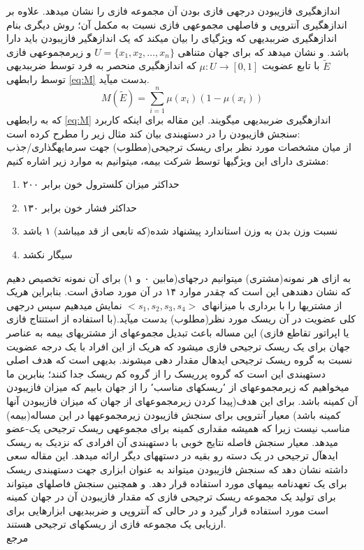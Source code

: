 \documentclass[10pt,a4paper]{article}
\newcommand{\نیمفاصله}{\halfspace}
\renewcommand{\ }{\halfspace}
\newcommand{\renderref}[1] { \begingroup \let\clearpage\relax  \endgroup }
\begin{document}
اندازه\ گیری فازی\ بودن درجه\ ی فازی بودن آن مجموعه فازی را نشان میدهد. علاوه بر اندازه\ گیری آنتروپی و فاصله\ ی مجموعه\ ی فازی نسبت به مکمل آن؛ روش دیگری بنام اندازه\ گیری ضرب\ بدیهی که ویژگی\ ای را بیان می\ کند که یک اندازه\ گیر فازی\ بودن باید دارا باشد. و نشان می\ دهد که برای جهان متناهی
$U = \{x_1, x_2, \ldots, x_n\}$
و زیرمجموعه\ ی فازی
$\tilde{E}$
با تابع عضویت
$\mu : U \rightarrow \left[0, 1\right]$
که اندازه\ گیری منحصر به فرد توسط ضرب\ بدیهی توسط رابطه\ ی
\ref{eq:M}
بدست می\ آید.
\begin{equation}
M\left(\tilde{E}\right) = \sum_{i=1}^{n} \mu\left(x_i\right)\left(1-\mu\left(x_i\right)\right)
\label{eq:M}
\end{equation}
که به رابطه\ ی
\ref{eq:M}
اندازه\ گیری ضرب\ بدیهی می\ گویند.
این مقاله برای اینکه کاربرد سنجش فازی\ بودن را در دسته\ بندی بیان کند مثال زیر را مطرح کرده است:\\
از میان مشخصات مورد نظر برای ریسک ترجیحی(مطلوب) جهت سرمایه\ گذاری/جذب مشتری دارای این ویژگی\ ها توسط شرکت بیمه، می\ توانیم به موارد زیر اشاره کنیم:

\begin{enumerate}
\item حداکثر میزان کلسترول خون برابر ۲۰۰ 
\item حداکثر فشار خون برابر ۱۳۰
\item نسبت وزن بدن به وزن استاندارد پیشنهاد شده(که تابعی از قد می\ باشد) ۱ باشد
\item سیگار نکشد
\end{enumerate}
به ازای هر نمونه(مشتری) می\ توانیم درجه\ ای(مابین ۰ و ۱) برای آن نمونه تخصیص دهیم که نشان دهنده\ ی این است که چقدر موارد ۱ ۴ در آن مورد صادق است. بنابراین هریک از مشتری\ ها را با برداری با میزان\ های
$<s_1, s_2, s_3, s_4>$
نمایش می\ دهیم سپس درجه\ ی کلی عضویت در آن ریسک مورد نظر(مطلوب) بدست می\ آید.(با استفاده از استنتاج فازی یا اپراتور تقاطع فازی)
این مساله باعث تبدیل مجموعه\ ای از مشتری\ های بیمه به عناصر جهان برای یک ریسک ترجیحی فازی می\ شود که هریک از این افراد با یک درجه عضویت نسبت به گروه ریسک ترجیحی ایده\ ال مقدار دهی می\ شوند. بدیهی است که هدف اصلی دسته\ بندی این است که گروه پرریسک را از گروه کم ریسک جدا کنند؛ بنابرین ما می\ خواهیم که زیرمجموعه\ ای از ٬ریسک\ های مناسب٬ را از جهان بابیم که میزان فازی\ بودن آن کمینه باشد.
برای این هدف(پیدا کردن زیرمجموعه\ ای از جهان که میزان فازی\ بودن آنها کمینه باشد) معیار آنتروپی برای سنجش فازی\ بودن زیرمجموعه\ ها در این مساله(بیمه) مناسب نیست زیرا که همیشه مقداری کمینه برای مجموعه\ ی ریسک ترجیحی یک-عضو می\ دهد. معیار سنجش فاصله نتایج خوبی با دسته\ بندی آن افرادی که نزدیک به ریسک ایده\ آل ترجیحی در یک دسته رو بقیه در دسته\ های دیگر ارائه می\ دهد.
این مقاله سعی داشته نشان دهد که سنجش فازی\ بودن می\ تواند به عنوان ابزاری جهت دسته\ بندی ریسک برای یک تعهدنامه بیمه\ ای مورد استفاده قرار دهد. و همچنین سنجش فاصله\ ای می\ تواند برای تولید یک مجموعه ریسک ترجیحی فازی که مقدار فازی\ بودن آن در جهان کمینه است مورد استفاده قرار گیرد و در حالی که آنتروپی و ضرب\ بدیهی ابزارهایی برای ارزیابی یک مجموعه فازی از ریسک\ های ترجیحی هستند.
\vspace{5em}
\\{\LARGE مرجع}
\renderref{reference}
\end{document}
